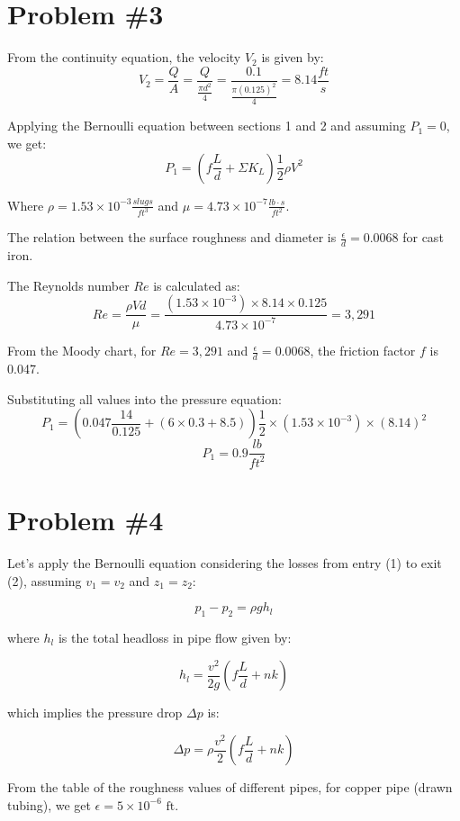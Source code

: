 \documentclass{article}
\begin{document}
\newpage
\section*{Problem \#3}
From the continuity equation, the velocity \( V_2 \) is given by:
\[ V_2 = \frac{Q}{A} = \frac{Q}{\frac{\pi d^2}{4}} = \frac{0.1}{\frac{\pi (0.125)^2}{4}} = 8.14 \frac{ft}{s} \]

Applying the Bernoulli equation between sections 1 and 2 and assuming \( P_1 = 0 \), we get:
\[ P_1 = \left( f \frac{L}{d} + \Sigma K_L \right) \frac{1}{2} \rho V^2 \]

Where \( \rho = 1.53 \times 10^{-3} \frac{slugs}{ft^3} \) and \( \mu = 4.73 \times 10^{-7} \frac{lb \cdot s}{ft^2} \).

The relation between the surface roughness and diameter is \( \frac{\epsilon}{d} = 0.0068 \) for cast iron.

The Reynolds number \( Re \) is calculated as:
\[ Re = \frac{\rho V d}{\mu} = \frac{(1.53 \times 10^{-3}) \times 8.14 \times 0.125}{4.73 \times 10^{-7}} = 3,291 \]

From the Moody chart, for \( Re = 3,291 \) and \( \frac{\epsilon}{d} = 0.0068 \), the friction factor \( f \) is 0.047.

Substituting all values into the pressure equation:
\[ P_1 = \left( 0.047 \frac{14}{0.125} + (6 \times 0.3 + 8.5) \right) \frac{1}{2} \times (1.53 \times 10^{-3}) \times (8.14)^2 \]
\[ P_1 = 0.9 \frac{lb}{ft^2} \]





\newpage
\section*{Problem \#4}

Let's apply the Bernoulli equation considering the losses from entry (1) to exit (2), assuming $v_1 = v_2$ and $z_1 = z_2$:

\[ p_1 - p_2 = \rho g h_l \]

where $h_l$ is the total headloss in pipe flow given by:

\[ h_l = \frac{v^2}{2g} \left( f \frac{L}{d} + nk \right) \]

which implies the pressure drop $\Delta p$ is:

\[ \Delta p = \rho \frac{v^2}{2} \left( f \frac{L}{d} + nk \right) \]

From the table of the roughness values of different pipes, for copper pipe (drawn tubing), we get $\epsilon = 5 \times 10^{-6} \text{ ft}$.
\end{document}
